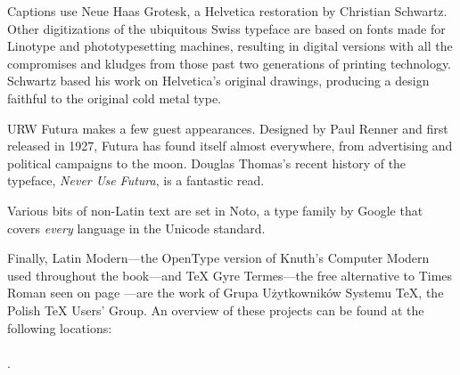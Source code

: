 Captions use
\textsf{\small Neue Haas Grotesk},
a Helvetica restoration by Christian Schwartz.
Other digitizations of the ubiquitous Swiss typeface are based on fonts made for
Linotype and phototypesetting machines,
resulting in digital versions with all the compromises and kludges from those
past two generations of printing technology.
Schwartz based his work on Helvetica's original drawings,
producing a design faithful to the original cold metal type.

{URW Futura}
makes a few guest appearances.
Designed by Paul Renner and first released in 1927,
Futura has found itself almost everywhere,
from advertising and political campaigns to the moon.
Douglas Thomas's recent history of the typeface,
\textit{Never Use Futura}, is a fantastic read.

Various bits of non-Latin text are set in
{Noto},
a type family by Google that covers \emph{every} language
in the Unicode standard.

Finally,
{\lm Latin Modern}---the OpenType version of Knuth's Computer Modern used throughout
the book---and
{\TeX{} Gyre Termes}---the
free alternative to Times Roman seen on page \pageref{typography}---are the
work of Grupa Użytkowników Systemu \TeX{}, the Polish \TeX{} Users' Group.
An overview of these projects can be found at the following locations:\\
 \\
.
